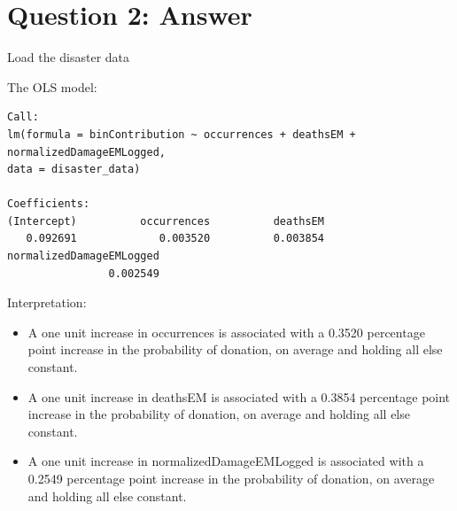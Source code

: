 \documentclass[12pt,letterpaper]{article}
\begin{document}
\newpage

\section*{Question 2: Answer}
\vspace{.5cm}

\noindent Load the disaster data


\vspace{.5cm}

\noindent The OLS model:


\begin{verbatim}
Call:
lm(formula = binContribution ~ occurrences + deathsEM + normalizedDamageEMLogged, 
data = disaster_data)

Coefficients:
(Intercept)          occurrences          deathsEM  
   0.092691             0.003520          0.003854  
normalizedDamageEMLogged  
                0.002549  
\end{verbatim}

\noindent Interpretation:

\begin{itemize}
\item A one unit increase in occurrences is associated with a 0.3520 percentage point increase in the probability of donation, on average and holding all else constant.

\item A one unit increase in deathsEM is associated with a 0.3854 percentage point increase in the probability of donation, on average and holding all else constant.

\item A one unit increase in normalizedDamageEMLogged is associated with a 0.2549 percentage point increase in the probability of donation, on average and holding all else constant.

\end{itemize}



\newpage
\end{document}
